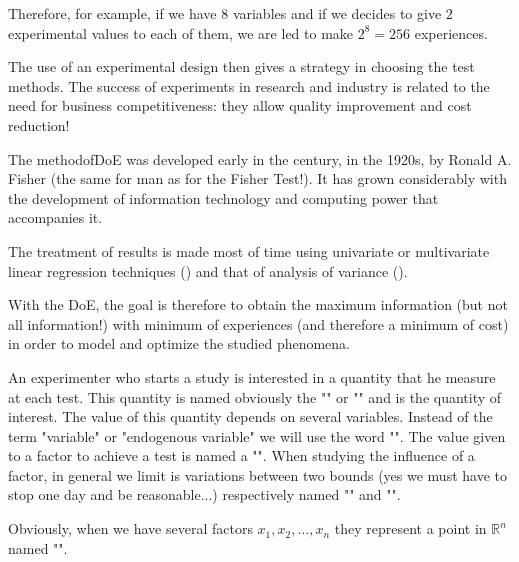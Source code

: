	Therefore, for example, if we have $8$ variables and if we decides to give $2$ experimental values to each of them, we are led to make $2^8=256$ experiences.
	
	The use of an experimental design then gives a strategy in choosing the test methods. The success of experiments in research and industry is related to the need for business competitiveness: they allow quality improvement and cost reduction!
	
	\begin{tcolorbox}[title=Remark,colframe=black,arc=10pt]
	The methodofDoE was developed early in the century, in the 1920s, by Ronald A. Fisher (the same for man as for the Fisher Test!). It has grown considerably with the development of information technology and computing power that accompanies it.
	\end{tcolorbox}
	The treatment of results is made most of time using univariate or multivariate linear regression techniques () and that of analysis of variance ().
	
	With the DoE, the goal is therefore to obtain the maximum information (but not all information!) with minimum of experiences (and therefore a minimum of cost) in order to model and optimize the studied phenomena.
	
	An experimenter who starts a study is interested in a quantity that he measure at each test. This quantity is named obviously the "" or "" and is the quantity of interest. The value of this quantity depends on several variables. Instead of the term "variable" or "endogenous variable" we will use the word "". The value given to a factor to achieve a test is named a "". When studying the influence of a factor, in general we limit is variations between two bounds (yes we must have to stop one day and be reasonable...) respectively named "" and "".
	
	Obviously, when we have several factors $x_1,x_2,…,x_n$ they represent a point in $\mathbb{R}^n$ named "".
	
